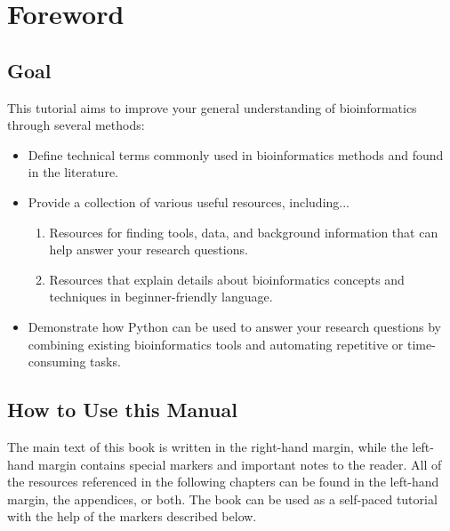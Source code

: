 \maketitle 
\listoftodos
\tableofcontents %

\chapter{Foreword}

\section{Goal}
This tutorial aims to improve your general understanding of bioinformatics through several methods:
\begin{itemize}
    \item Define technical terms commonly used in bioinformatics methods and found in the literature.
    \item Provide a collection of various useful resources, including...
    \begin{enumerate}
        \item Resources for finding tools, data, and background information that can help answer your research questions.
        \item Resources that explain details about bioinformatics concepts and techniques in beginner-friendly language.
    \end{enumerate}
    \item Demonstrate how Python can be used to answer your research questions by combining existing bioinformatics tools and automating repetitive or time-consuming tasks.
\end{itemize}

\section{How to Use this Manual}
The main text of this book is written in the right-hand margin, while the left-hand margin contains special markers and important notes to the reader. All of the resources referenced in the following chapters can be found in the left-hand margin, the appendices, or both. The book can be used as a self-paced tutorial with the help of the markers described below.

